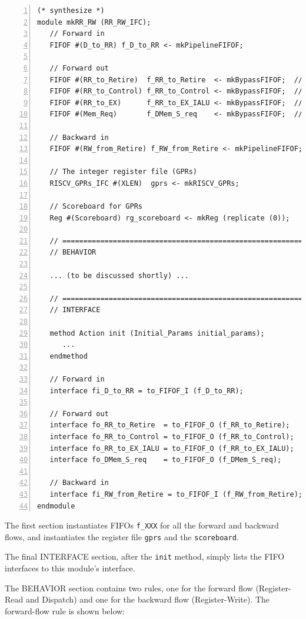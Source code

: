 {\small
\begin{Verbatim}[frame=single, numbers=left, label=(In file:src\_Fife/S3\_RR\_RW.bsv)]
(* synthesize *)
module mkRR_RW (RR_RW_IFC);
   // Forward in
   FIFOF #(D_to_RR) f_D_to_RR <- mkPipelineFIFOF;

   // Forward out
   FIFOF #(RR_to_Retire)  f_RR_to_Retire  <- mkBypassFIFOF;  // Direct
   FIFOF #(RR_to_Control) f_RR_to_Control <- mkBypassFIFOF;  // Control pipe
   FIFOF #(RR_to_EX)      f_RR_to_EX_IALU <- mkBypassFIFOF;  // Integer pipe
   FIFOF #(Mem_Req)       f_DMem_S_req    <- mkBypassFIFOF;  // DMem pipe

   // Backward in
   FIFOF #(RW_from_Retire) f_RW_from_Retire <- mkPipelineFIFOF;

   // The integer register file (GPRs)
   RISCV_GPRs_IFC #(XLEN)  gprs <- mkRISCV_GPRs;

   // Scoreboard for GPRs
   Reg #(Scoreboard) rg_scoreboard <- mkReg (replicate (0));

   // ================================================================
   // BEHAVIOR

   ... (to be discussed shortly) ...

   // ================================================================
   // INTERFACE

   method Action init (Initial_Params initial_params);
      ...
   endmethod

   // Forward in
   interface fi_D_to_RR = to_FIFOF_I (f_D_to_RR);

   // Forward out
   interface fo_RR_to_Retire  = to_FIFOF_O (f_RR_to_Retire);
   interface fo_RR_to_Control = to_FIFOF_O (f_RR_to_Control);
   interface fo_RR_to_EX_IALU = to_FIFOF_O (f_RR_to_EX_IALU);
   interface fo_DMem_S_req    = to_FIFOF_O (f_DMem_S_req);

   // Backward in
   interface fi_RW_from_Retire = to_FIFOF_I (f_RW_from_Retire);
endmodule
\end{Verbatim}
}

The first section instantiates FIFOs {\tt f\_XXX} for all the forward
and backward flows, and instantiates the register file \verb|gprs| and
the \verb|scoreboard|.

The final INTERFACE section, after the \verb|init| method, simply
lists the FIFO interfaces to this module's interface.

The BEHAVIOR section contains two rules, one for the forward flow
(Register-Read and Dispatch) and one for the backward flow
(Register-Write).  The forward-flow rule is shown below:

